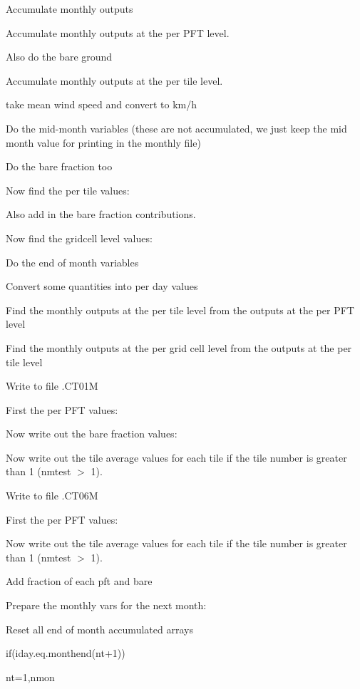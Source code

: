 Accumulate monthly outputs

Accumulate monthly outputs at the per P\+F\+T level.

Also do the bare ground

Accumulate monthly outputs at the per tile level.

take mean wind speed and convert to km/h

Do the mid-\/month variables (these are not accumulated, we just keep the mid month value for printing in the monthly file)

Do the bare fraction too

Now find the per tile values\+:

Also add in the bare fraction contributions.

Now find the gridcell level values\+:

Do the end of month variables

Convert some quantities into per day values

Find the monthly outputs at the per tile level from the outputs at the per P\+F\+T level

Find the monthly outputs at the per grid cell level from the outputs at the per tile level

Write to file .C\+T01\+M

First the per P\+F\+T values\+:

Now write out the bare fraction values\+:

Now write out the tile average values for each tile if the tile number is greater than 1 (nmtest $>$ 1).

Write to file .C\+T06\+M

First the per P\+F\+T values\+:

Now write out the tile average values for each tile if the tile number is greater than 1 (nmtest $>$ 1).

Add fraction of each pft and bare

Prepare the monthly vars for the next month\+:

Reset all end of month accumulated arrays

if(iday.\+eq.\+monthend(nt+1))

nt=1,nmon 